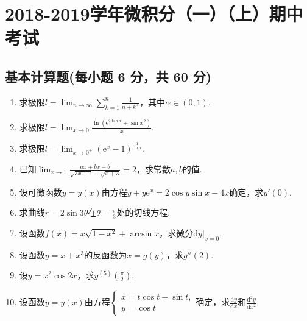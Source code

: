 \documentclass[../main.tex]{subfiles}
\begin{document}
\chapter{2018-2019学年微积分（一）（上）期中考试}

\section{基本计算题(每小题 6 分，共 60 分)}
\begin{enumerate}
    \item 求极限$l=\lim_{n\to \infty}\sum_{k=1}^{n}\frac{1}{n+k^{\alpha}}$，其中$\alpha
              \in(0,1)$.
          \vspace{11em}

    \item 求极限$l=\lim_{x\to 0}\frac{\ln\left(\mathrm{e}^{2\tan x}+\sin x^{2}\right)}{x}$.
          \vspace{10em}

    \item 求极限$l=\lim_{x\to 0^+}\left(\mathrm{e}^{x}-1\right)^{\frac{1}{\ln x}}$.
          \vspace{11em}

    \item 已知$\lim_{x\to1}\frac{ax+bx+b}{\sqrt{3x+1}-\sqrt{x+3}}=2$，求常数$a,b$的值.
          \vspace{10em}

    \item 设可微函数$y=y(x)$由方程$y+y\mathrm{e}^{x}=2\cos y\sin x-4x$确定，求$y'
              (0)$.
          \vspace{10em}

    \item 求曲线$r=2\sin3\theta$在$\theta=\frac{\pi}{3}$处的切线方程.
          \vspace{10em}

    \item 设函数$f(x)=x\sqrt{1-x^{2}}+\arcsin x$，求微分$\left.\mathrm{d}y\right|
              _{x=0}$.
          \vspace{11em}

    \item 设函数$y=x+x^{3}$的反函数为$x=g(y)$，求$g''(2)$.
          \vspace{12em}

    \item 设$y=x^{2}\cos 2x$，求$y^{(5)}\left(\frac{\pi}{2}\right)$.
          \vspace{8em}

    \item 设函数$y=y(x)$由方程$\begin{cases}
                  x=t\cos t-\sin t, \\
                  y=\cos t
              \end{cases}$确定，求$\frac{\mathrm{d}y}{\mathrm{d}x}$和$\frac{\mathrm{d}^{2}y}{\mathrm{d}x^{2}}$.
          \vspace{8em}
\end{enumerate}
\end{document}
